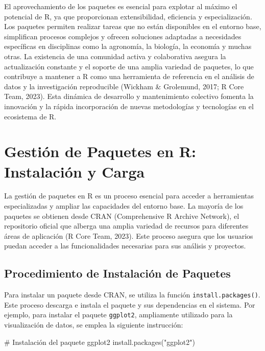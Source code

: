 \documentclass[
  spanish,
  a4paper,
  DIV=11,
  numbers=noendperiod,
  onepage,
  openany]{scrreprt}
\newenvironment{Shaded}{\begin{snugshade}}{\end{snugshade}}
\newcommand{\CommentTok}[1]{\textcolor[rgb]{0.37,0.37,0.37}{#1}}
\newcommand{\FunctionTok}[1]{\textcolor[rgb]{0.28,0.35,0.67}{#1}}
\newcommand{\NormalTok}[1]{\textcolor[rgb]{0.00,0.23,0.31}{#1}}
\newcommand{\StringTok}[1]{\textcolor[rgb]{0.13,0.47,0.30}{#1}}
\begin{document}
El aprovechamiento de los paquetes es esencial para explotar al máximo
el potencial de R, ya que proporcionan extensibilidad, eficiencia y
especialización. Los paquetes permiten realizar tareas que no están
disponibles en el entorno base, simplifican procesos complejos y ofrecen
soluciones adaptadas a necesidades específicas en disciplinas como la
agronomía, la biología, la economía y muchas otras. La existencia de una
comunidad activa y colaborativa asegura la actualización constante y el
soporte de una amplia variedad de paquetes, lo que contribuye a mantener
a R como una herramienta de referencia en el análisis de datos y la
investigación reproducible (Wickham \& Grolemund, 2017; R Core Team,
2023). Esta dinámica de desarrollo y mantenimiento colectivo fomenta la
innovación y la rápida incorporación de nuevas metodologías y
tecnologías en el ecosistema de R.

\section{Gestión de Paquetes en R: Instalación y
Carga}\label{gestiuxf3n-de-paquetes-en-r-instalaciuxf3n-y-carga}

La gestión de paquetes en R es un proceso esencial para acceder a
herramientas especializadas y ampliar las capacidades del entorno base.
La mayoría de los paquetes se obtienen desde CRAN (Comprehensive R
Archive Network), el repositorio oficial que alberga una amplia variedad
de recursos para diferentes áreas de aplicación (R Core Team, 2023).
Este proceso asegura que los usuarios puedan acceder a las
funcionalidades necesarias para sus análisis y proyectos.

\subsection{\texorpdfstring{\textbf{Procedimiento de Instalación de
Paquetes}}{Procedimiento de Instalación de Paquetes}}\label{procedimiento-de-instalaciuxf3n-de-paquetes}

Para instalar un paquete desde CRAN, se utiliza la función
\texttt{install.packages()}. Este proceso descarga e instala el paquete
y sus dependencias en el sistema. Por ejemplo, para instalar el paquete
\texttt{ggplot2}, ampliamente utilizado para la visualización de datos,
se emplea la siguiente instrucción:

\begin{Shaded}
\begin{Highlighting}[]
\CommentTok{\# Instalación del paquete ggplot2}
\FunctionTok{install.packages}\NormalTok{(}\StringTok{"ggplot2"}\NormalTok{)}
\end{Highlighting}
\end{Shaded}
\end{document}
